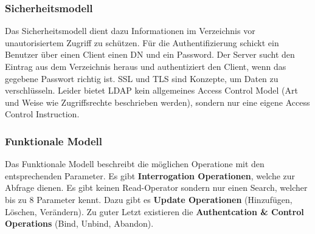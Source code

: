 \subsubsection{Sicherheitsmodell}

Das Sicherheitsmodell dient dazu Informationen im Verzeichnis vor unautorisiertem Zugriff zu schützen. Für die Authentifizierung schickt ein Benutzer über einen Client einen DN und ein Password. Der Server sucht den Eintrag aus dem Verzeichnis heraus und authentiziert den Client, wenn das gegebene Passwort richtig ist. SSL und TLS sind Konzepte, um Daten zu verschlüsseln. Leider bietet LDAP kein allgemeines Access Control Model (Art und Weise wie Zugriffsrechte beschrieben werden), sondern nur eine eigene Access Control Instruction.

\subsubsection{Funktionale Modell}

Das Funktionale Modell beschreibt die möglichen Operatione mit den entsprechenden Parameter. Es gibt \textbf{Interrogation Operationen}, welche zur Abfrage dienen. Es gibt keinen Read-Operator sondern nur einen Search, welcher bis zu 8 Parameter kennt. Dazu gibt es \textbf{Update Operationen} (Hinzufügen, Löschen, Verändern). Zu guter Letzt existieren die \textbf{Authentcation \& Control Operations} (Bind, Unbind, Abandon).